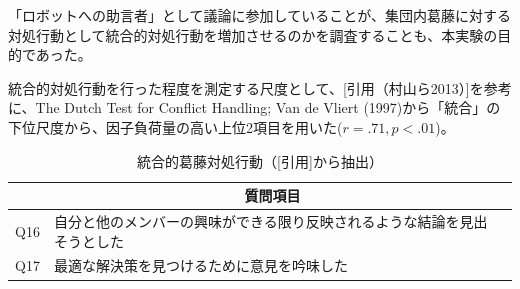 \documentclass[11pt, a4paper]{jreport} %
\begin{document}

「ロボットへの助言者」として議論に参加していることが、集団内葛藤に対する対処行動として統合的対処行動を増加させるのかを調査することも、本実験の目的であった。


統合的対処行動を行った程度を測定する尺度として、[引用（村山ら2013）]を参考に、The Dutch Test for Conflict Handling; Van de Vliert (1997)から「統合」の下位尺度から、因子負荷量の高い上位2項目を用いた($r=.71, p<.01$)。

\begin{table}[H]
\caption{統合的葛藤対処行動（{[}引用{]}から抽出）}
\centering
\label{tab:conflict_deal}
\begin{tabular}{@{}lll@{}}
\toprule
\multicolumn{1}{c}{} & \multicolumn{1}{c}{質問項目}             \\ \midrule
             Q16      & 自分と他のメンバーの興味ができる限り反映されるような結論を見出そうとした \\
                 Q17    & 最適な解決策を見つけるために意見を吟味した                 \\ \bottomrule
\end{tabular}
\end{table}
\end{document}
